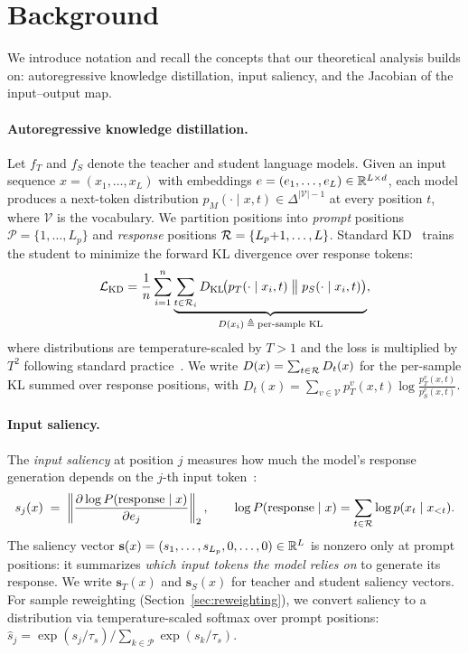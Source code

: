 
\section{Background}
\label{sec:background}

We introduce notation and recall the concepts that our theoretical analysis builds on: autoregressive knowledge distillation, input saliency, and the Jacobian of the input--output map.

\paragraph{Autoregressive knowledge distillation.}
Let $f_T$ and $f_S$ denote the teacher and student language models.
Given an input sequence $x = (x_1, \ldots, x_L)$ with embeddings $e = (e_1, \ldots, e_L) \in \mathbb{R}^{L \times d}$, each model produces a next-token distribution $p_M(\cdot \mid x, t) \in \Delta^{|\mathcal{V}|-1}$ at every position $t$, where $\mathcal{V}$ is the vocabulary.
We partition positions into \emph{prompt} positions $\mathcal{P} = \{1, \ldots, L_p\}$ and \emph{response} positions $\mathcal{R} = \{L_p{+}1, \ldots, L\}$.
Standard KD~\citep{hinton2015distilling} trains the student to minimize the forward KL divergence over response tokens:
\begin{equation}\label{eq:standard-kd}
  \mathcal{L}_{\mathrm{KD}}
  = \frac{1}{n} \sum_{i=1}^{n} \underbrace{\sum_{t \in \mathcal{R}_i} D_{\mathrm{KL}}\!\bigl( p_T(\cdot \mid x_i, t) \;\big\|\; p_S(\cdot \mid x_i, t) \bigr)}_{D(x_i) \;\triangleq\; \text{per-sample KL}},
\end{equation}
where distributions are temperature-scaled by $T > 1$ and the loss is multiplied by $T^2$ following standard practice~\citep{hinton2015distilling}.
We write $D(x) = \sum_{t \in \mathcal{R}} D_t(x)$ for the per-sample KL summed over response positions, with $D_t(x) = \sum_{v \in \mathcal{V}} p_T^v(x,t) \log \frac{p_T^v(x,t)}{p_S^v(x,t)}$.

\paragraph{Input saliency.}
The \emph{input saliency} at position $j$ measures how much the model's response generation depends on the $j$-th input token~\citep{wu-etal-2023-ad}:
\begin{equation}\label{eq:saliency-def}
  s_j(x) \;=\; \left\| \frac{\partial \log P(\text{response} \mid x)}{\partial e_j} \right\|_2,
  \qquad
  \log P(\text{response} \mid x) = \sum_{t \in \mathcal{R}} \log p(x_t \mid x_{<t}).
\end{equation}
The saliency vector $\mathbf{s}(x) = (s_1, \ldots, s_{L_p}, 0, \ldots, 0) \in \mathbb{R}^L$ is nonzero only at prompt positions: it summarizes \emph{which input tokens the model relies on} to generate its response.
We write $\mathbf{s}_T(x)$ and $\mathbf{s}_S(x)$ for teacher and student saliency vectors.
For sample reweighting (Section~\ref{sec:reweighting}), we convert saliency to a distribution via temperature-scaled softmax over prompt positions: $\hat{s}_j = \exp(s_j / \tau_s) / \sum_{k \in \mathcal{P}} \exp(s_k / \tau_s)$.

